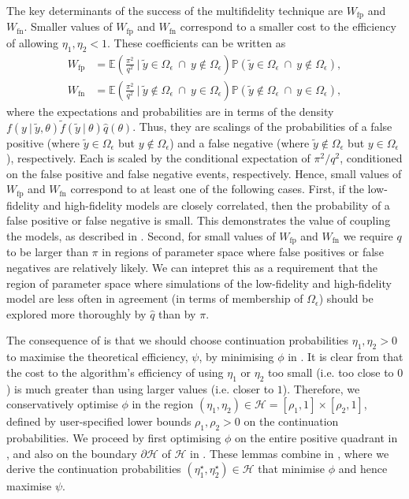 \documentclass[12pt, onecolumn]{article}
\newcommand{\fp}[1]{#1_{\mathrm{fp}}}
\newcommand{\fn}[1]{#1_{\mathrm{fn}}}
\begin{document}
The key determinants of the success of the multifidelity technique are $\fp W$ and $\fn W$.
Smaller values of $\fp W$ and $\fn W$ correspond to a smaller cost to the efficiency of allowing $\eta_1,\eta_2<1$.
These coefficients can be written as
\begin{align*}
 \fp W 
 &= 
 \mathbb E \left( \frac{\pi^2}{q^2} ~\bigg|~ \tilde y \in \Omega_\epsilon ~\cap~ y \notin \Omega_\epsilon \right) \mathbb P \left( \tilde y \in \Omega_\epsilon ~\cap~ y \notin \Omega_\epsilon \right),
 \\
 \fn W 
 &= 
 \mathbb E \left( \frac{\pi^2}{q^2} ~\bigg|~ \tilde y \notin \Omega_\epsilon ~\cap~ y \in \Omega_\epsilon \right) \mathbb P \left( \tilde y \notin \Omega_\epsilon ~\cap~ y \in \Omega_\epsilon \right),
\end{align*}
where the expectations and probabilities are in terms of the density $f(y~|~\tilde y, \theta) \tilde f(\tilde y~|~\theta) \hat q(\theta)$.
Thus, they are scalings of the probabilities of a false positive (where $\tilde y \in \Omega_\epsilon$ but $y \notin \Omega_\epsilon$) and a false negative (where $\tilde y \notin \Omega_\epsilon$ but $y \in \Omega_\epsilon$), respectively.
Each is scaled by the conditional expectation of $\pi^2 / q^2$, conditioned on the false positive and false negative events, respectively.
Hence, small values of $\fp W$ and $\fn W$ correspond to at least one of the following cases.
First, if the low-fidelity and high-fidelity models are closely correlated, then the probability of a false positive or false negative is small.
This demonstrates the value of coupling the models, as described in .
Second, for small values of $\fp W$ and $\fn W$ we require $q$ to be larger than $\pi$ in regions of parameter space where false positives or false negatives are relatively likely.
We can intepret this as a requirement that the region of parameter space where simulations of the low-fidelity and high-fidelity model are less often in agreement (in terms of membership of $\Omega_\epsilon$) should be explored more thoroughly by $\hat q$ than by $\pi$.

The consequence of  is that we should choose continuation probabilities $\eta_1,\eta_2>0$ to maximise the theoretical efficiency, $\psi$, by minimising $\phi$ in .
It is clear from  that the cost to the algorithm's efficiency of using $\eta_1$ or $\eta_2$ too small (i.e. too close to $0$) is much greater than using larger values (i.e. closer to $1$).
Therefore, we conservatively optimise $\phi$ in the region $(\eta_1,\eta_2) \in \mathcal H = [\rho_1,1] \times [\rho_2, 1]$, defined by user-specified lower bounds $\rho_1, \rho_2 > 0$ on the continuation probabilities.
We proceed by first optimising $\phi$ on the entire positive quadrant in , and also on the boundary $\partial \mathcal H$ of $\mathcal H$ in . 
These lemmas combine in , where we derive the continuation probabilities $(\eta_1^\star, \eta_2^\star) \in \mathcal H$ that minimise $\phi$ and hence maximise $\psi$.
\end{document}
